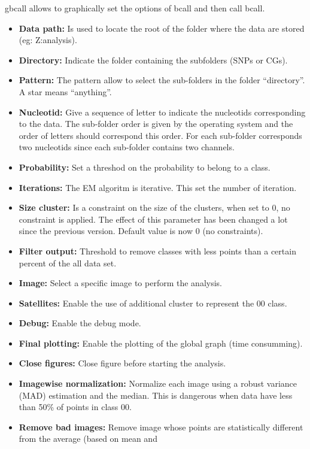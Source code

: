 \documentclass{scrartcl}
\begin{document}
gbcall allows to graphically set the options of bcall and then call
bcall.
\begin{itemize}
\item \textbf{Data path:} Is used to locate the root of the folder
  where the data are stored (eg: Z:analysis).
\item \textbf{Directory:} Indicate the folder containing the
  subfolders (SNPs or CGs).
\item \textbf{Pattern:} The pattern allow to select the sub-folders in
  the folder ``directory''. A star means ``anything''. 
\item \textbf{Nucleotid:} Give a sequence of letter to indicate the
  nucleotids corresponding to the data. The sub-folder order is given
  by the operating system and the order of letters should correspond
  this order. For each sub-folder corresponds two nucleotids since
  each sub-folder contains two channels.
\item \textbf{Probability:} Set a threshod on the probability to
  belong to a class. 
\item \textbf{Iterations:} The EM algoritm is iterative. This set the
  number of iteration.
\item \textbf{Size cluster:} Is a constraint on the size of the
  clusters, when set to 0, no constraint is applied. The effect of
  this parameter has been changed a lot since the previous
  version. Default value is now 0 (no constraints).
\item \textbf{Filter output:} Threshold to remove classes with less
  points than a certain percent of the all data set.
\item \textbf{Image:} Select a specific image to perform the analysis.
\item \textbf{Satellites:} Enable the use of additional cluster to
  represent the 00 class.
\item \textbf{Debug:} Enable the debug mode.
\item \textbf{Final plotting:} Enable the plotting of the global graph
  (time consumming).
\item \textbf{Close figures:} Close figure before starting the
  analysis.
\item \textbf{Imagewise normalization:} Normalize each image using a
  robust variance (MAD) estimation and the median. This is dangerous
  when data have less than 50\% of points in class 00.
\item \textbf{Remove bad images:} Remove image whose points are
  statistically different from the average (based on mean and

\end{itemize}
\end{document}
